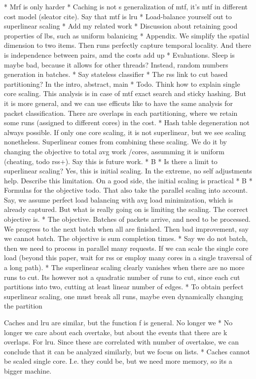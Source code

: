 * Mrf is only harder
* Caching is not s generalization of mtf, it's mtf in different cost model (sleator cite). Say that mtf is lru
* Load-balance yourself out to superlinear scaling
* Add my related work
* Discussion about retaining good properties of lbs, such as uniform balanicing
* Appendix. We simplify the spatial dimension to two items. Then runs perfectly capture temporal locality. And there is independence between pairs, amd the costs add up
* Evaluations. Sleep is maybe bad, because it allows for other threads? Instead, random numbers generation in batches.
* Say stateless classifier
* The rss link to cut based partitioning? In the intro, abstract, main
* Todo. Think how to explain single core scaling. This analysis is in case of mtf exact search and sticky hashing. But it is more general, and we can use efficuts like to have the same analysis for packet classification. There are overlaps in each partitioning, where we retain some runs (assigned to different cores) in the cost.
* Hash table degeneration not always possible. If only one core scaling, it is not superlinear, but we see scaling nonetheless. Superlinear comes from combining these scaling. We do it by changing the objective to total avg work /cores, assumming it is uniform (cheating, todo rss+). Say this is future work.
* B
* Is there a limit to superlinear scaling? Yes, this is initial scaling. In the extreme, no self adjustments help. Describe this limitation. On a good side, the initial scaling is practical
* B
* Formulas for the objective todo. That also take the parallel scaling into account. Say, we assume perfect load balancing with avg load minimization, which is already captured. But what is really going on is limiting the scaling. The correct objective is.
* The objective. Batches of packets arrive, and need to be processed. We progress to the next batch when all are finished. Then bad improvement, say we cannot batch. The objective is sum completion times.
* Say we do not batch, then we need to process in parallel many requests. If we can scale the single core load (beyond this paper, wait for rss or employ many cores in a single traversal of a long path).
* The superlinear scaling clearly vanishes when there are no more runs to cut. Its however not a quadratic number of runs to cut, since each cut partitions into two, cutting at least linear number of edges.
* To obtain perfect superlinear scaling, one must break all runs, maybe even dynamically changing the partition




Caches and lru are similar, but the function f is general. No longer we
* No longer we care about each overtake, but about the events that there are k overlaps. For lru. Since these are correlated with number of overtakse, we can conclude that it can be analyzed similarly, but we focus on lists.
* Caches cannot be scaled single core. I.e. they could be, but we need more memory, so its a bigger machine.

